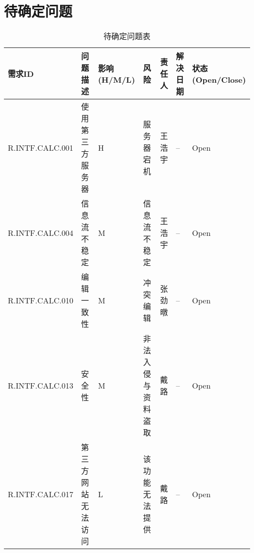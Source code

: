 \chapter{待确定问题}
    \begin{table}[htbp]
        \centering
            \caption{待确定问题表} \label{tab:tbd_problems}
        \begin{tabular}{|p{8em}|p{5em}|p{3em}|p{5em}|p{3em}|p{2em}|p{5em}|}
                \hline
                需求ID & 问题描述 & 影响(H/M/L) & 风险 & 责任人 & 解决日期 & 状态(Open/Close) \\
                \hline
                R.INTF.CALC.001 & 使用第三方服务器 & H & 服务器宕机 & 王浩宇 & -- & Open\\
                \hline
                R.INTF.CALC.004 & 信息流不稳定 & M & 信息流不稳定 & 王浩宇 & -- & Open\\
                \hline
                R.INTF.CALC.010 & 编辑一致性 & M & 冲突编辑 & 张劲暾 & -- & Open\\
                \hline
                R.INTF.CALC.013 & 安全性 & M & 非法入侵与资料盗取 & 戴路 & -- & Open\\
                \hline
                    \color{red}R.INTF.CALC.017 
                &   \color{red}第三方网站无法访问 
                &   \color{red}L 
                &   \color{red}该功能无法提供 
                &   \color{red}戴路 
                &   \color{red}-- 
                &   \color{red}Open  \\
                \hline
            \end{tabular}
    \end{table}
